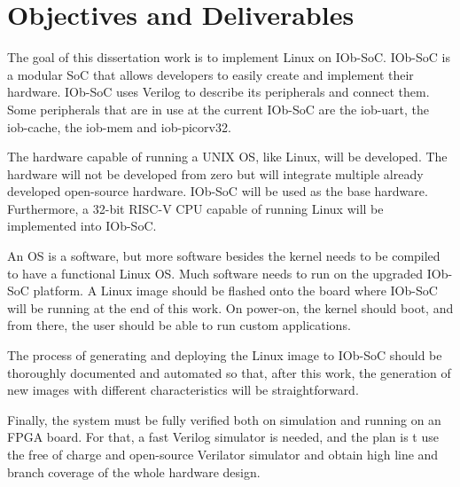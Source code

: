 \section{Objectives and Deliverables}
\label{section:objectives}
The goal of this dissertation work is to implement Linux on IOb-SoC. IOb-SoC is a modular SoC that allows developers to easily create and implement their hardware. IOb-SoC uses Verilog to describe its peripherals and connect them. Some peripherals that are in use at the current IOb-SoC are the iob-uart, the iob-cache, the iob-mem and iob-picorv32.

The hardware capable of running a UNIX OS, like Linux, will be developed. The hardware will not be developed from zero but will integrate multiple already developed open-source hardware. IOb-SoC will be used as the base hardware. Furthermore, a 32-bit RISC-V CPU capable of running Linux will be implemented into IOb-SoC.

An OS is a software, but more software besides the kernel needs to be compiled to have a functional Linux OS. Much software needs to run on the upgraded IOb-SoC platform. A Linux image should be flashed onto the board where IOb-SoC will be running at the end of this work. On power-on, the kernel should boot, and from there, the user should be able to run custom applications. 

The process of generating and deploying the Linux image to IOb-SoC should be thoroughly documented and automated so that, after this work, the generation of new images with different characteristics will be straightforward.

Finally, the system must be fully verified both on simulation and running on an FPGA board. For that, a fast Verilog simulator is needed, and the plan is t use the free of charge and open-source Verilator simulator and obtain high line and branch coverage of the whole hardware design.

